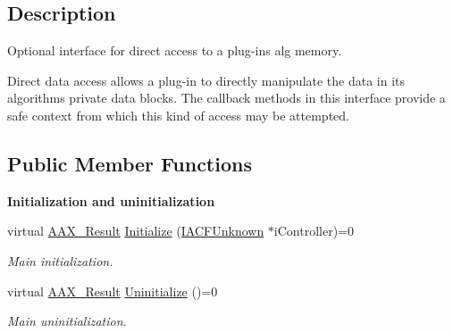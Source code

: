 \subsection{Description}
Optional interface for direct access to a plug-\/in\textquotesingle{}s alg memory. 

Direct data access allows a plug-\/in to directly manipulate the data in its algorithm\textquotesingle{}s private data blocks. The callback methods in this interface provide a safe context from which this kind of access may be attempted. \subsection*{Public Member Functions}
\begin{Indent}\textbf{ Initialization and uninitialization}\par
\begin{DoxyCompactItemize}
\item 
virtual \mbox{\hyperlink{a00392_a4d8f69a697df7f70c3a8e9b8ee130d2f}{A\+A\+X\+\_\+\+Result}} \mbox{\hyperlink{a01661_adefbc617c71ea5ea6512fb79a116dbf7}{Initialize}} (\mbox{\hyperlink{a01409}{I\+A\+C\+F\+Unknown}} $\ast$i\+Controller)=0
\begin{DoxyCompactList}\small\item\em Main initialization. \end{DoxyCompactList}\item 
virtual \mbox{\hyperlink{a00392_a4d8f69a697df7f70c3a8e9b8ee130d2f}{A\+A\+X\+\_\+\+Result}} \mbox{\hyperlink{a01661_ad56406a13dd691db6f1117ab97cfc90a}{Uninitialize}} ()=0
\begin{DoxyCompactList}\small\item\em Main uninitialization. \end{DoxyCompactList}\end{DoxyCompactItemize}
\end{Indent}
